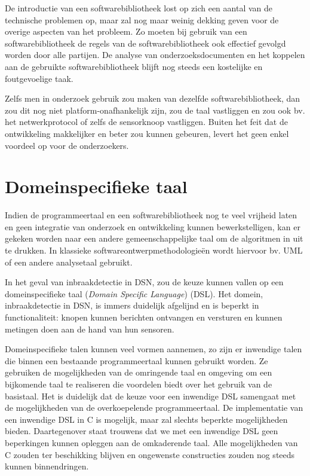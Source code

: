 De introductie van een softwarebibliotheek lost op zich een aantal van de
technische problemen op, maar zal nog maar weinig dekking geven voor de overige
aspecten van het probleem. Zo moeten bij gebruik van een softwarebibliotheek de
regels van de softwarebibliotheek ook effectief gevolgd worden door alle
partijen. De analyse van onderzoeksdocumenten en het koppelen aan de gebruikte
softwarebibliotheek blijft nog steeds een kostelijke en foutgevoelige taak.

Zelfs men in onderzoek gebruik zou maken van dezelfde softwarebibliotheek, dan
zou dit nog niet platform-onafhankelijk zijn, zou de taal vastliggen en zou ook
bv. het netwerkprotocol of zelfs de sensorknoop vastliggen. Buiten het feit dat
de ontwikkeling makkelijker en beter zou kunnen gebeuren, levert het geen enkel
voordeel op voor de onderzoekers.

\vspace{-3mm}

\section{Domeinspecifieke taal}
\label{section:solution-dsl}

Indien de programmeertaal en een softwarebibliotheek nog te veel vrijheid laten
en geen integratie van onderzoek en ontwikkeling kunnen bewerkstelligen, kan er
gekeken worden naar een andere gemeenschappelijke taal om de algoritmen in uit
te drukken. In klassieke softwareontwerpmethodologie\"en wordt hiervoor bv. UML
\citep{url:uml} of een andere analysetaal gebruikt.

In het geval van inbraakdetectie in DSN, zou de keuze kunnen vallen op een
domeinspecifieke taal (\emph{Domain Specific Language})
(DSL)\citep{van2000domain, mernik2005and, fowler2010domain}. Het domein,
inbraakdetectie in DSN, is immers duidelijk afgelijnd en is beperkt in
functionaliteit: knopen kunnen berichten ontvangen en versturen en kunnen
metingen doen aan de hand van hun sensoren.

Domeinspecifieke talen kunnen veel vormen aannemen, zo zijn er inwendige talen
die binnen een bestaande programmeertaal kunnen gebruikt worden. Ze gebruiken
de mogelijkheden van de omringende taal en omgeving om een bijkomende taal te
realiseren die voordelen biedt over het gebruik van de basistaal. Het is
duidelijk dat de keuze voor een inwendige DSL samengaat met de mogelijkheden
van de overkoepelende programmeertaal. De implementatie van een inwendige DSL
in C is mogelijk, maar zal slechts beperkte mogelijkheden bieden. Daartegenover
staat trouwens dat we met een inwendige DSL geen beperkingen kunnen opleggen
aan de omkaderende taal. Alle mogelijkheden van C zouden ter beschikking
blijven en ongewenste constructies zouden nog steeds kunnen binnendringen.

